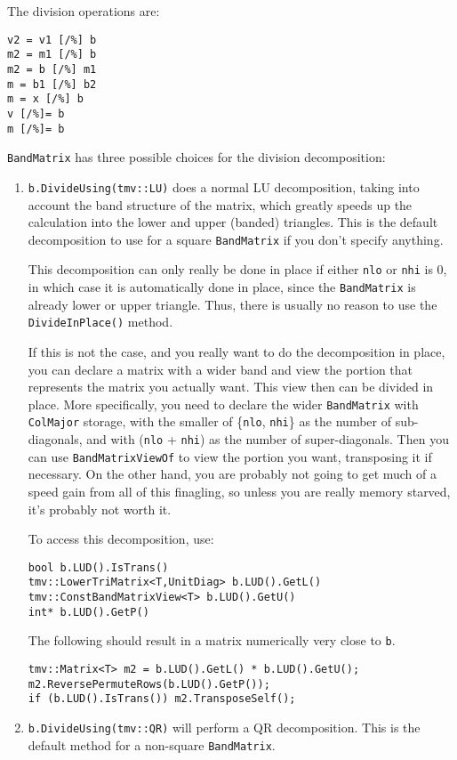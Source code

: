 \documentclass[twoside,letterpaper,11pt]{article}
\renewcommand{\tt}[1]{{\texttt {#1}}}
\begin{document}
The division operations are:
\begin{verbatim}
v2 = v1 [/%] b
m2 = m1 [/%] b
m2 = b [/%] m1
m = b1 [/%] b2
m = x [/%] b
v [/%]= b
m [/%]= b
\end{verbatim}
\tt{BandMatrix} has three possible choices for the division decomposition:
\begin{enumerate}
\item
\tt{b.DivideUsing(tmv::LU)} does a normal LU decomposition,
taking into account the band structure of the matrix, which greatly speeds up 
the calculation into the lower and upper (banded) triangles.
This is the default decomposition to use for a square \tt{BandMatrix} 
if you don't specify anything.

This decomposition can only really
be done in place if either \tt{nlo} or \tt{nhi} is 0,
in which case it is automatically done in place,
since the \tt{BandMatrix} is already lower or upper triangle.
Thus, there is usually no reason to use the \tt{DivideInPlace()} method.

If this is not the case, and you really want to do the decomposition in place, you can
declare a matrix with a wider band and view the portion that represents the matrix
you actually want.  This view then can be divided in place.  More specifically,
you need to declare the wider \tt{BandMatrix} with \tt{ColMajor} storage,
with the smaller of
\{\tt{nlo}, \tt{nhi}\} as the number of sub-diagonals, and with 
(\tt{nlo} + \tt{nhi}) as the number of super-diagonals.  
Then you can use \tt{BandMatrixViewOf} to view the portion you want, transposing it if
necessary.  On the other hand, you are probably not going to get much of a speed gain 
from all of this finagling, so unless you are really memory starved, it's probably not worth it.

To access this decomposition, use:
\begin{verbatim}
bool b.LUD().IsTrans()
tmv::LowerTriMatrix<T,UnitDiag> b.LUD().GetL()
tmv::ConstBandMatrixView<T> b.LUD().GetU()
int* b.LUD().GetP()
\end{verbatim}
The following should result in a matrix numerically very close to \tt{b}.
\begin{verbatim}
tmv::Matrix<T> m2 = b.LUD().GetL() * b.LUD().GetU();
m2.ReversePermuteRows(b.LUD().GetP());
if (b.LUD().IsTrans()) m2.TransposeSelf();
\end{verbatim}

\item
\tt{b.DivideUsing(tmv::QR)} will perform a QR decomposition.  
This is the default method for a non-square \tt{BandMatrix}.


\end{enumerate}
\end{document}
